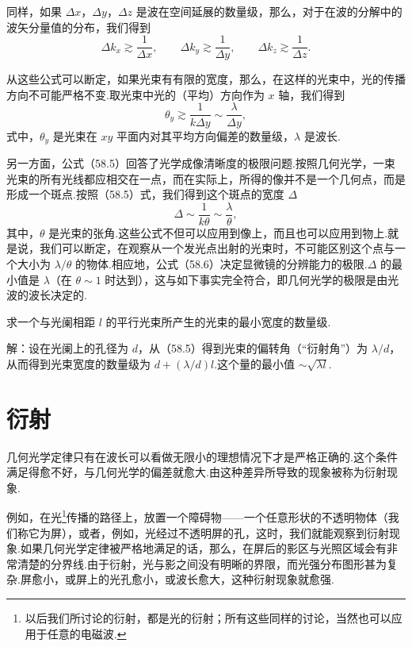 同样，如果 $\Delta x$，$\Delta y$，$\Delta z$ 是波在空间延展的数量级，那么，对于在波的分解中的波矢分量值的分布，我们得到
\begin{equation}
  \Delta k_x\gtrsim\frac{1}{\Delta x},\qquad
  \Delta k_y\gtrsim\frac{1}{\Delta y},\qquad
  \Delta k_z\gtrsim\frac{1}{\Delta z}.
\end{equation}

从这些公式可以断定，如果光束有有限的宽度，那么，在这样的光束中，光的传播方向不可能严格不变.取光束中光的（平均）方向作为 $x$ 轴，我们得到
\begin{equation}
  \theta_y\gtrsim\frac{1}{k\Delta y}\sim\frac{\lambda}{\Delta y},
\end{equation}
式中，$\theta_y$ 是光束在 $xy$ 平面内对其平均方向偏差的数量级，$\lambda$ 是波长.

另一方面，公式（58.5）回答了光学成像清晰度的极限问题.按照几何光学，一束光束的所有光线都应相交在一点，而在实际上，所得的像并不是一个几何点，而是形成一个斑点.按照（58.5）式，我们得到这个斑点的宽度 $\Delta$
\begin{equation}
  \Delta\sim\frac{1}{k\theta}\sim\frac{\lambda}{\theta},
\end{equation}
其中，$\theta$ 是光束的张角.这些公式不但可以应用到像上，而且也可以应用到物上.就是说，我们可以断定，在观察从一个发光点出射的光束时，不可能区别这个点与一个大小为 $\lambda/\theta$ 的物体.相应地，公式（58.6）决定显微镜的分辨能力的极限.$\Delta$ 的最小值是 $\lambda$（在 $\theta\sim 1$ 时达到），这与如下事实完全符合，即几何光学的极限是由光波的波长决定的.

\begin{xiti}

\quad 求一个与光阑相距 $l$ 的平行光束所产生的光束的最小宽度的数量级.

解：设在光阑上的孔径为 $d$，从（58.5）得到光束的偏转角（“衍射角”）为 $\lambda/d$，从而得到光束宽度的数量级为 $d+(\lambda/d)l$.这个量的最小值 $\sim\sqrt{\lambda l}$.

\end{xiti}

\section{衍射}

几何光学定律只有在波长可以看做无限小的理想情况下才是严格正确的.这个条件满足得愈不好，与几何光学的偏差就愈大.由这种差异所导致的现象被称为衍射现象.

例如，在光\footnote{以后我们所讨论的衍射，都是光的衍射；所有这些同样的讨论，当然也可以应用于任意的电磁波.}传播的路径上，放置一个障碍物——一个任意形状的不透明物体（我们称它为屏），或者，例如，光经过不透明屏的孔，这时，我们就能观察到衍射现象.如果几何光学定律被严格地满足的话，那么，在屏后的影区与光照区域会有非常清楚的分界线.由于衍射，光与影之间没有明晰的界限，而光强分布图形甚为复杂.屏愈小，或屏上的光孔愈小，或波长愈大，这种衍射现象就愈强.

